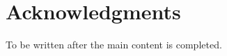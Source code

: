 \chapter*{Acknowledgments}%
\label{sec:woord-vooraf}
\thispagestyle{plain}

To be written after the main content is completed.